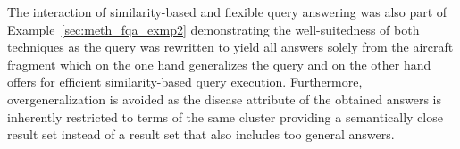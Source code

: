 The interaction of similarity-based and flexible query answering was also part of Example~\ref{sec:meth_fqa_exmp2} demonstrating the well-suitedness of both
techniques as the query was rewritten to yield all answers solely from the aircraft fragment which on the one hand generalizes the query and on the other hand
offers for efficient similarity-based query execution. Furthermore, overgeneralization \citep{Wiese2014} is avoided as the disease attribute of the obtained 
answers is inherently restricted to terms of the same cluster providing a semantically close result set instead of a result set that also includes too general
answers.


